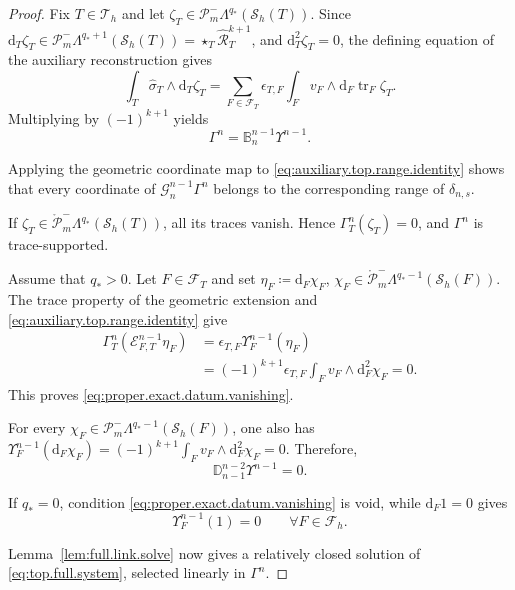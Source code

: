 \documentclass[a4paper,11pt]{article}
\theoremstyle{definition}
\newcommand{\DIFF}{\mathrm{d}}
\newcommand{\Sh}{\mathcal{S}_h}
\newcommand{\PLtrim}[2]{\mathcal{P}_{#1}^{-}\Lambda^{#2}}
\newcommand{\trc}{\operatorname{tr}}
\newcommand{\epsTF}{\epsilon_{T,F}}
\newcommand{\PLtrimz}[2]{\mathring{\mathcal P}_{#1}^{-}\Lambda^{#2}}
\begin{document}
\begin{proof}
Fix $T\in\mathcal T_h$ and let $\zeta_T\in\PLtrim{m}{q_*}(\Sh(T))$.
Since $\DIFF_T\zeta_T \in \PLtrim{m}{q_*+1}(\Sh(T)) = \star_T\widehat{\mathcal R}_T^{k+1}$, and $\DIFF_T^2\zeta_T=0$, the defining equation of the auxiliary reconstruction gives
\[
  \int_T
  \widehat\sigma_T\wedge\DIFF_T\zeta_T
  =
  \sum_{F\in\mathcal F_T}
  \epsTF
  \int_F
  v_F\wedge\DIFF_F\trc_F\zeta_T.
\]
Multiplying by $(-1)^{k+1}$ yields
\begin{equation}\label{eq:auxiliary.top.range.identity}
  \Gamma^n
  =
  \mathbb B_n^{n-1}\Upsilon^{n-1}.
\end{equation}

Applying the geometric coordinate map to \eqref{eq:auxiliary.top.range.identity} shows that every coordinate of $\mathcal G_n^{n-1}\Gamma^n$ belongs to the corresponding range of $\delta_{n,s}$.

If $\zeta_T\in\PLtrimz{m}{q_*}(\Sh(T))$, all its traces vanish.
Hence $\Gamma_T^n(\zeta_T)=0$, and $\Gamma^n$ is trace-supported.

Assume that $q_*>0$.
Let $F\in\mathcal F_T$ and set $\eta_F \coloneqq \DIFF_F\chi_F$, $\chi_F \in \PLtrimz{m}{q_*-1}(\Sh(F))$.
The trace property of the geometric extension and \eqref{eq:auxiliary.top.range.identity} give
\[
\begin{aligned}
  \Gamma_T^n
  \left(
    \mathcal E_{F,T}^{n-1}\eta_F
  \right)
  &=
  \epsTF
  \Upsilon_F^{n-1}(\eta_F)
  \\
  &=
  (-1)^{k+1}
  \epsTF
  \int_F
  v_F\wedge\DIFF_F^2\chi_F
  =
  0.
\end{aligned}
\]
This proves \eqref{eq:proper.exact.datum.vanishing}.

For every $\chi_F\in\PLtrim{m}{q_*-1}(\Sh(F))$, one also has $\Upsilon_F^{n-1}(\DIFF_F\chi_F) = (-1)^{k+1} \int_F v_F\wedge\DIFF_F^2\chi_F = 0$.
Therefore,
\begin{equation}\label{eq:auxiliary.certificate.vertical.closedness}
  \mathbb D_{n-1}^{n-2}
  \Upsilon^{n-1}
  =
  0.
\end{equation}

If $q_*=0$, condition \eqref{eq:proper.exact.datum.vanishing} is void, while $\DIFF_F1=0$ gives
\begin{equation}\label{eq:auxiliary.certificate.augmentation}
  \Upsilon_F^{n-1}(1)
  =
  0
  \qquad
  \forall F\in\mathcal F_h.
\end{equation}

Lemma~\ref{lem:full.link.solve} now gives a relatively closed solution of \eqref{eq:top.full.system}, selected linearly in $\Gamma^n$.


\end{proof}
\end{document}
